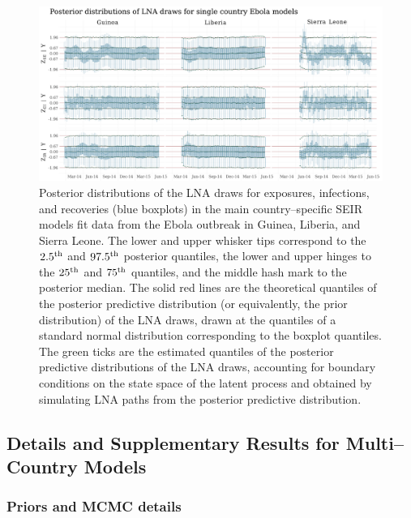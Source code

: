 \begin{figure}[htbp]
	\begin{fullpage}
		\centering
		\includegraphics[width=\linewidth]{figures/ebola_single_drawplots}
		\caption[Posterior distributions of LNA draws for the main country--specific SEIR models fit to data from the West Africa Ebola outbreak.]{Posterior distributions of the LNA draws for exposures, infections, and recoveries (blue boxplots) in the main country--specific SEIR models fit data from the Ebola outbreak in Guinea, Liberia, and Sierra Leone. The lower and upper whisker tips correspond to the $ 2.5^{\mathrm{th}} $ and $ 97.5^{\mathrm{th}} $ posterior quantiles, the lower and upper hinges to the $ 25^{\mathrm{th}} $ and $ 75^{\mathrm{th}} $ quantiles, and the middle hash mark to the posterior median. The solid red lines are the theoretical quantiles of the posterior predictive distribution (or equivalently, the prior distribution) of the LNA draws, drawn at the quantiles of a standard normal distribution corresponding to the boxplot quantiles. The green ticks are the estimated quantiles of the posterior predictive distributions of the LNA draws, accounting for boundary conditions on the state space of the latent process and obtained by simulating LNA paths from the posterior predictive distribution.}
		\label{fig:ebola_single_drawplots}
	\end{fullpage}
\end{figure}

\newpage
\subsection{Details and Supplementary Results for Multi--Country Models}
\label{subsec:ebola_joint_supplement}

\subsubsection{Priors and MCMC details}
\label{subsubsec:ebola_joint_mcmc}

